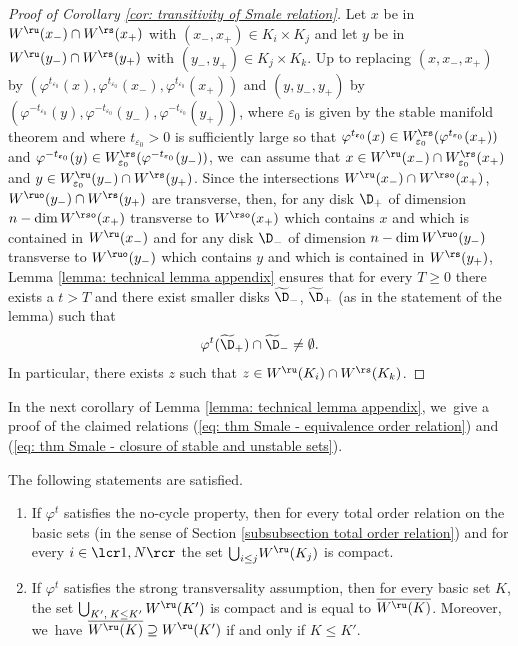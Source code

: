\begin{appendix}
\begin{proof}[Proof of Corollary \ref{cor: transitivity of Smale relation}]
Let $x$ be in $W^\ru (x_-) \cap W^\rs (x_+)$ with $(x_-,x_+) \in K_i \times K_j$ and let $y$ be in $W^\ru (y_-) \cap W^\rs (y_+)$ with $(y_-,y_+) \in K_j \times K_k$. Up to replacing $(x,x_-,x_+)$ by $(\varphi^{t_{\varepsilon_0}}(x), \varphi^{t_{\varepsilon_0}} (x_-), \varphi^{t_{\varepsilon_0}}(x_+))$ and $(y,y_-,y_+)$ by $(\varphi^{-t_{\varepsilon_0}}(y), \varphi^{-t_{\varepsilon_0}} (y_-), \varphi^{-t_{\varepsilon_0}}(y_+))$, where $\varepsilon_0$ is given by the stable manifold theorem and where $t_{\varepsilon_0} > 0$ is sufficiently large so that $\varphi^{t_{\varepsilon_0}}(x) \in W_{\varepsilon_0}^\rs (\varphi^{t_{\varepsilon_0}}(x_+))$ and $\varphi^{-t_{\varepsilon_0}}(y) \in W_{\varepsilon_0}^\rs (\varphi^{-t_{\varepsilon_0}}(y_-))$, we~can assume that $x \in W^\ru (x_-) \cap W_{\varepsilon_0}^\rs (x_+)$ and $y \in W_{\varepsilon_0}^\ru (y_-) \cap W^\rs (y_+)$. Since the intersections $W^{\ru} (x_-) \cap W^{\rso} (x_+)$, $W^{\ruo} (y_-) \cap W^{\rs} (y_+)$ are transverse, then, for any disk $\D_{+}$ of dimension $n - \dim W^{\rso} (x_+)$ transverse to $W^{\rso} (x_+)$ which contains $x$ and which is contained in $W^{\ru} (x_-)$ and for any disk $\D_{-}$ of dimension $n - \dim W^{\ruo} (y_-)$ transverse to $W^{\ruo} (y_-)$ which contains $y$ and which is contained in $W^{\rs} (y_+)$, Lemma \ref{lemma: technical lemma appendix} ensures that for every $T \geq 0$ there exists a $t > T$ and there exist smaller disks $\widetilde{\D}_-$, $\widetilde{\D}_+$ (as in the statement of the lemma) such that
\[
\varphi^t (\widetilde{\D}_{+}) \cap \widetilde{\D}_{-} \neq \emptyset.
\]
In particular, there exists $z$ such that $z \in W^{\ru} (K_i) \cap W^{\rs}(K_k)$.
\end{proof}

In the next corollary of Lemma \ref{lemma: technical lemma appendix}, we~give a proof of the claimed relations (\ref{eq: thm Smale - equivalence order relation}) and (\ref{eq: thm Smale - closure of stable and unstable sets}).

\begin{corollary}\label{cor: corollary technical lemma - closure of unstable sets} The following statements are satisfied.
\begin{enumerate}
\item\label{cor: corollary technical lemma - closure of unstable sets1} If $\varphi^t$ satisfies the no-cycle property, then for every total order relation on the basic sets (in the sense of Section \ref{subsubsection total order relation}) and for every $i\in\lcr1,N\rcr$ the set $\bigcup_{i \leq j}\!W^\ru (K_j)$ is compact.
\item\label{cor: corollary technical lemma - closure of unstable sets2} If $\varphi^t$ satisfies the strong transversality assumption, then for every basic set $K$, the set $\bigcup_{K', \: K \leq K'} W^\ru (K')$ is compact and is equal to $\overline{W^\ru (K)}$. Moreover, we~have $\overline{W^\ru (K)} \supseteq W^\ru (K')$ if and only if $K \leq K'$.
\end{enumerate}
\end{corollary}


\end{appendix}
